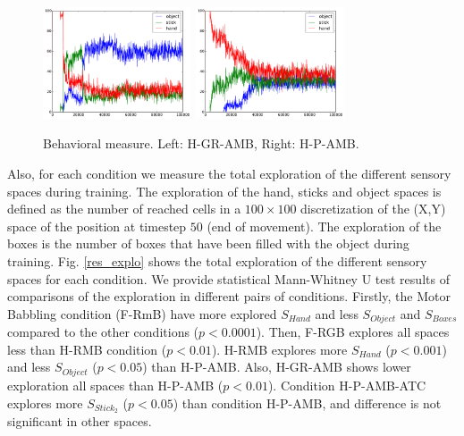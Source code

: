 \documentclass[10pt,letterpaper]{article}
\begin{document}
	\begin{figure}[ht]
		\centering
		\includegraphics[width=4.4cm]{./include/H-RGB-GR-AMB-log15-events-100000.pdf}
		\hspace{-0.4cm}
		\includegraphics[width=4.4cm]{./include/H-RGB-P-AMB-log8-events-100000.pdf}
		\caption{Behavioral measure. Left: H-GR-AMB, Right: H-P-AMB.}
		\label{res_ow}
	\end{figure}
	

	Also, for each condition we measure the total exploration of the different sensory spaces during training. 
	The exploration of the hand, sticks and object spaces is defined as the number of reached cells 
	in a $100\times100$ discretization of the (X,Y) space of the position at timestep $50$ (end of movement).
	The exploration of the boxes is the number of boxes that have been filled with the object during training.
	Fig. \ref{res_explo} shows the total exploration of the different sensory spaces for each condition.
	We provide statistical Mann-Whitney U test results of comparisons of the exploration in different pairs of conditions.
	Firstly, the Motor Babbling condition (F-RmB) have more explored $S_{Hand}$ and less $S_{Object}$ and $S_{Boxes}$ compared to the other conditions ($p<0.0001$).
	Then, F-RGB explores all spaces less than H-RMB condition ($p<0.01$).
	H-RMB explores more $S_{Hand}$ ($p<0.001$) and less $S_{Object}$ ($p<0.05$) than H-P-AMB.
	Also, H-GR-AMB shows lower exploration all spaces than H-P-AMB ($p<0.01$).
	Condition H-P-AMB-ATC explores more $S_{Stick_2}$ ($p<0.05$) than condition H-P-AMB, and difference is not significant in other spaces.
	
\end{document}
